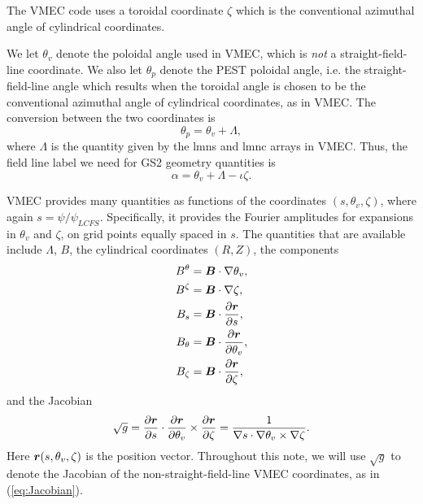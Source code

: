 \documentclass[11pt,letter]{article}
\newcommand{\vect}[1]{\mbox{\boldmath $#1$}}
\begin{document}
The VMEC code uses a toroidal coordinate $\zeta$ which is the conventional azimuthal angle of cylindrical coordinates. 

We let $\theta_v$ denote the poloidal angle used in VMEC, which is \emph{not} a straight-field-line coordinate.
We also let $\theta_p$ denote the PEST poloidal angle, i.e. the straight-field-line angle which results when
the toroidal angle is chosen to be the conventional azimuthal angle of cylindrical coordinates, as in VMEC.
The conversion between the two coordinates is
\begin{equation}
\theta_p = \theta_v + \Lambda,
\end{equation}
where $\Lambda$ is the quantity given by the {\ttfamily lmns} and {\ttfamily lmnc} arrays in VMEC.
Thus, the field line label we need for GS2 geometry quantities is
\begin{equation}
\alpha = \theta_v + \Lambda - \iota \zeta.
\label{eq:alpha_vmec}
\end{equation}

VMEC provides many quantities as functions of the coordinates $(s, \theta_v, \zeta)$,
where again $s = \psi / \psi_{LCFS}$.
Specifically, it provides the Fourier amplitudes for expansions in $\theta_v$ and $\zeta$,
on grid points equally spaced in $s$.
The quantities that are available include
$\Lambda$, $B$, the cylindrical coordinates $(R,Z)$, the components
\begin{align}
B^\theta &= \vect{B}\cdot\nabla\theta_v, \nonumber \\
B^\zeta &= \vect{B}\cdot\nabla\zeta, \nonumber \\
B_s &= \vect{B}\cdot\frac{\partial\vect{r}}{\partial s}, \nonumber \\
B_\theta &= \vect{B}\cdot\frac{\partial\vect{r}}{\partial \theta_v}, \nonumber \\
B_\zeta &= \vect{B}\cdot\frac{\partial\vect{r}}{\partial \zeta}, \nonumber
\end{align}
and the Jacobian
\begin{equation}
\sqrt{g} = \frac{\partial \vect{r}}{\partial s} \cdot \frac{\partial \vect{r}}{\partial\theta_v} \times \frac{\partial\vect{r}}{\partial\zeta}
= \frac{1}{\nabla s \cdot \nabla \theta_v \times\nabla\zeta}.
\label{eq:Jacobian}
\end{equation}
Here $\vect{r}(s,\theta_v,\zeta)$ is the position vector.
Throughout this note, we will use $\sqrt{g}$ to denote the Jacobian of the non-straight-field-line
VMEC coordinates, as in (\ref{eq:Jacobian}).
\end{document}
